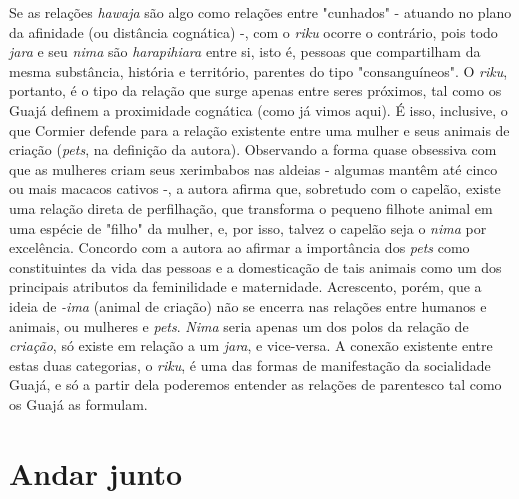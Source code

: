 

Se as relações \emph{hawaja} são algo como relações entre "cunhados" -
atuando no plano da afinidade (ou distância cognática) -, com o
\emph{riku} ocorre o contrário, pois todo \emph{jara} e seu \emph{nima}
são \emph{harapihiara} entre si, isto é, pessoas que compartilham da
mesma substância, história e território, parentes do tipo
"consanguíneos". O \emph{riku}, portanto, é o tipo da relação que surge
apenas entre seres próximos, tal como os Guajá definem a proximidade
cognática (como já vimos aqui). É isso, inclusive, o que Cormier defende
para a relação existente entre uma mulher e seus animais de criação
(\emph{pets}, na definição da autora). Observando a forma quase
obsessiva com que as mulheres criam seus xerimbabos nas aldeias -
algumas mantêm até cinco ou mais macacos cativos -, a autora afirma que,
sobretudo com o capelão, existe uma relação direta de perfilhação, que
transforma o pequeno filhote animal em uma espécie de "filho" da mulher,
e, por isso, talvez o capelão seja o \emph{nima} por excelência.
Concordo com a autora ao afirmar a importância dos \emph{pets} como
constituintes da vida das pessoas e a domesticação de tais animais como
um dos principais atributos da feminilidade e maternidade. Acrescento,
porém, que a ideia de \emph{-ima} (animal de criação) não se encerra nas
relações entre humanos e animais, ou mulheres e \emph{pets}. \emph{Nima}
seria apenas um dos polos da relação de \emph{criação}, só existe em
relação a um \emph{jara}, e vice-versa. A conexão existente entre estas
duas categorias, o \emph{riku}, é uma das formas de manifestação da
socialidade Guajá, e só a partir dela poderemos entender as relações de
parentesco tal como os Guajá as formulam.

\section{Andar junto}

